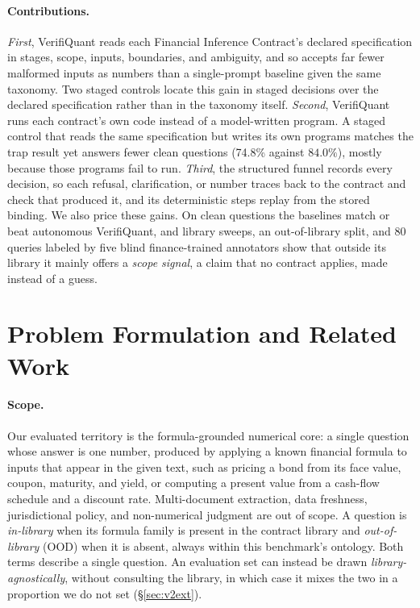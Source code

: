 \documentclass[sigconf]{acmart}
\newcommand{\stagedTwoCov}{74.8\%}     %
\begin{document}
\paragraph{Contributions.}
\emph{First}, VerifiQuant reads each Financial Inference Contract's declared specification in stages, scope, inputs, boundaries, and ambiguity, and so accepts far fewer malformed inputs as numbers than a single-prompt baseline given the same taxonomy. Two staged controls locate this gain in staged decisions over the declared specification rather than in the taxonomy itself.
\emph{Second}, VerifiQuant runs each contract's own code instead of a model-written program. A staged control that reads the same specification but writes its own programs matches the trap result yet answers fewer clean questions (\stagedTwoCov{} against $84.0\%$), mostly because those programs fail to run.
\emph{Third}, the structured funnel records every decision, so each refusal, clarification, or number traces back to the contract and check that produced it, and its deterministic steps replay from the stored binding.
We also price these gains. On clean questions the baselines match or beat autonomous VerifiQuant, and library sweeps, an out-of-library split, and 80 queries labeled by five blind finance-trained annotators show that outside its library it mainly offers a \emph{scope signal}, a claim that no contract applies, made instead of a guess.

\section{Problem Formulation and Related Work}\label{sec:v2problem}
\paragraph{Scope.} Our evaluated territory is the formula-grounded numerical core: a single question whose answer is one number, produced by applying a known financial formula to inputs that appear in the given text, such as pricing a bond from its face value, coupon, maturity, and yield, or computing a present value from a cash-flow schedule and a discount rate.
Multi-document extraction, data freshness, jurisdictional policy, and non-numerical judgment are out of scope.
A question is \emph{in-library} when its formula family is present in the contract library and \emph{out-of-library} (OOD) when it is absent, always within this benchmark's ontology. Both terms describe a single question. An evaluation set can instead be drawn \emph{library-agnostically}, without consulting the library, in which case it mixes the two in a proportion we do not set (\S\ref{sec:v2ext}).
\end{document}
